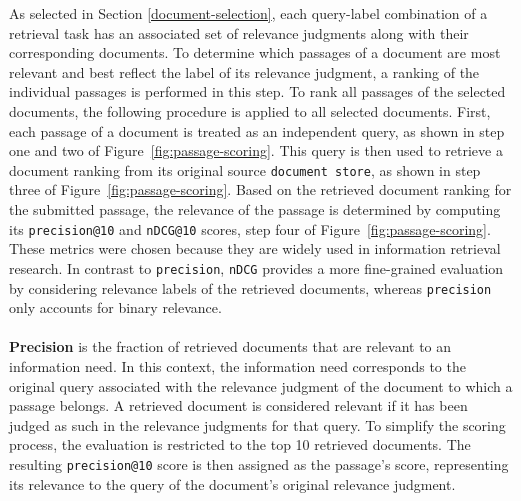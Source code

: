 As selected in Section \ref{document-selection}, each query-label combination of a retrieval task has an associated set of relevance judgments along with their corresponding documents. To determine which passages of a document are most relevant and best reflect the label of its relevance judgment, a ranking of the individual passages is performed in this step. To rank all passages of the selected documents, the following procedure is applied to all selected documents. First, each passage of a document is treated as an independent query, as shown in step one and two of Figure~\ref{fig:passage-scoring}. This query is then used to retrieve a document ranking from its original source \texttt{document store}, as shown in step three of \mbox{Figure~\ref{fig:passage-scoring}}. Based on the retrieved document ranking for the submitted passage, the relevance of the passage is determined by computing its \texttt{precision@10} and \texttt{nDCG@10} scores, step four of Figure~\ref{fig:passage-scoring}. These metrics were chosen because they are widely used in information retrieval research. In contrast to \texttt{precision}, \texttt{nDCG} provides a more fine-grained evaluation by considering relevance labels of the retrieved documents, whereas \texttt{precision} only accounts for binary relevance.
\\\\
\textbf{Precision} is the fraction of retrieved documents that are relevant to an information need. In this context, the information need corresponds to the original query associated with the relevance judgment of the document to which a passage belongs. A retrieved document is considered relevant if it has been judged as such in the relevance judgments for that query. To simplify the scoring process, the evaluation is restricted to the top 10 retrieved documents. The resulting \texttt{precision@10} score is then assigned as the passage's score, representing its relevance to the query of the document's original relevance judgment.
\\\\
